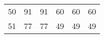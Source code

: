 \begin{table}[!ht]
{\begin{tabular}{SSSSSS}
      50            & 91               & 91               & 60               & 60               & 60               \\
      51            & 77               & 77               & 49               & 49               & 49               \\
      \bottomrule
    \end{tabular}\label{table:efficiency-generated_table}

  }
\end{table}
